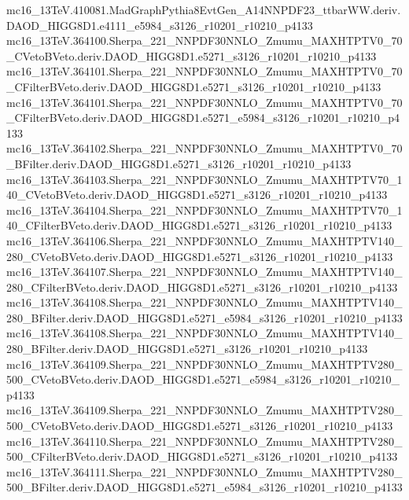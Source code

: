 \begin{scriptsize}
mc16\_13TeV.410081.MadGraphPythia8EvtGen\_A14NNPDF23\_ttbarWW.deriv.DAOD\_HIGG8D1.e4111\_e5984\_s3126\_r10201\_r10210\_p4133 \\
mc16\_13TeV.364100.Sherpa\_221\_NNPDF30NNLO\_Zmumu\_MAXHTPTV0\_70\_CVetoBVeto.deriv.DAOD\_HIGG8D1.e5271\_s3126\_r10201\_r10210\_p4133 \\
mc16\_13TeV.364101.Sherpa\_221\_NNPDF30NNLO\_Zmumu\_MAXHTPTV0\_70\_CFilterBVeto.deriv.DAOD\_HIGG8D1.e5271\_s3126\_r10201\_r10210\_p4133 \\
mc16\_13TeV.364101.Sherpa\_221\_NNPDF30NNLO\_Zmumu\_MAXHTPTV0\_70\_CFilterBVeto.deriv.DAOD\_HIGG8D1.e5271\_e5984\_s3126\_r10201\_r10210\_p4133 \\
mc16\_13TeV.364102.Sherpa\_221\_NNPDF30NNLO\_Zmumu\_MAXHTPTV0\_70\_BFilter.deriv.DAOD\_HIGG8D1.e5271\_s3126\_r10201\_r10210\_p4133 \\
mc16\_13TeV.364103.Sherpa\_221\_NNPDF30NNLO\_Zmumu\_MAXHTPTV70\_140\_CVetoBVeto.deriv.DAOD\_HIGG8D1.e5271\_s3126\_r10201\_r10210\_p4133 \\
mc16\_13TeV.364104.Sherpa\_221\_NNPDF30NNLO\_Zmumu\_MAXHTPTV70\_140\_CFilterBVeto.deriv.DAOD\_HIGG8D1.e5271\_s3126\_r10201\_r10210\_p4133 \\
mc16\_13TeV.364106.Sherpa\_221\_NNPDF30NNLO\_Zmumu\_MAXHTPTV140\_280\_CVetoBVeto.deriv.DAOD\_HIGG8D1.e5271\_s3126\_r10201\_r10210\_p4133 \\
mc16\_13TeV.364107.Sherpa\_221\_NNPDF30NNLO\_Zmumu\_MAXHTPTV140\_280\_CFilterBVeto.deriv.DAOD\_HIGG8D1.e5271\_s3126\_r10201\_r10210\_p4133 \\
mc16\_13TeV.364108.Sherpa\_221\_NNPDF30NNLO\_Zmumu\_MAXHTPTV140\_280\_BFilter.deriv.DAOD\_HIGG8D1.e5271\_e5984\_s3126\_r10201\_r10210\_p4133 \\
mc16\_13TeV.364108.Sherpa\_221\_NNPDF30NNLO\_Zmumu\_MAXHTPTV140\_280\_BFilter.deriv.DAOD\_HIGG8D1.e5271\_s3126\_r10201\_r10210\_p4133 \\
mc16\_13TeV.364109.Sherpa\_221\_NNPDF30NNLO\_Zmumu\_MAXHTPTV280\_500\_CVetoBVeto.deriv.DAOD\_HIGG8D1.e5271\_e5984\_s3126\_r10201\_r10210\_p4133 \\
mc16\_13TeV.364109.Sherpa\_221\_NNPDF30NNLO\_Zmumu\_MAXHTPTV280\_500\_CVetoBVeto.deriv.DAOD\_HIGG8D1.e5271\_s3126\_r10201\_r10210\_p4133 \\
mc16\_13TeV.364110.Sherpa\_221\_NNPDF30NNLO\_Zmumu\_MAXHTPTV280\_500\_CFilterBVeto.deriv.DAOD\_HIGG8D1.e5271\_s3126\_r10201\_r10210\_p4133 \\
mc16\_13TeV.364111.Sherpa\_221\_NNPDF30NNLO\_Zmumu\_MAXHTPTV280\_500\_BFilter.deriv.DAOD\_HIGG8D1.e5271\_e5984\_s3126\_r10201\_r10210\_p4133 \\

\end{scriptsize}
